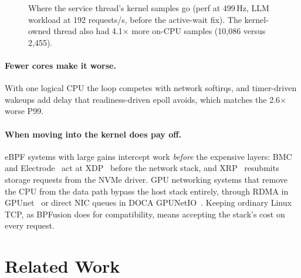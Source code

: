 \documentclass[sigconf,nonacm]{acmart}
\begin{document}
\begin{figure}[t]
\centering
{}
\caption{Where the service thread's kernel samples go (perf at 499\,Hz, LLM
workload at 192 requests/s, before the active-wait fix). The kernel-owned
thread also had 4.1$\times$ more on-CPU samples (10,086 versus 2,455).}
\label{fig:profile}
\end{figure}

\paragraph{Fewer cores make it worse.} With one logical CPU the loop competes
with network softirqs, and timer-driven wakeups add delay that readiness-driven
epoll avoids, which matches the 2.6$\times$ worse P99.

\paragraph{When moving into the kernel does pay off.} eBPF systems with large
gains intercept work \emph{before} the expensive layers: BMC~\cite{bmc} and
Electrode~\cite{electrode} act at XDP~\cite{xdp} before the network stack, and
XRP~\cite{xrp} resubmits storage requests from the NVMe driver. GPU networking
systems that remove the CPU from the data path bypass the host stack entirely,
through RDMA in GPUnet~\cite{gpunet} or direct NIC queues in DOCA
GPUNetIO~\cite{gpunetio}. Keeping ordinary Linux TCP, as BPFusion does for
compatibility, means accepting the stack's cost on every request.

\section{Related Work}
\end{document}
